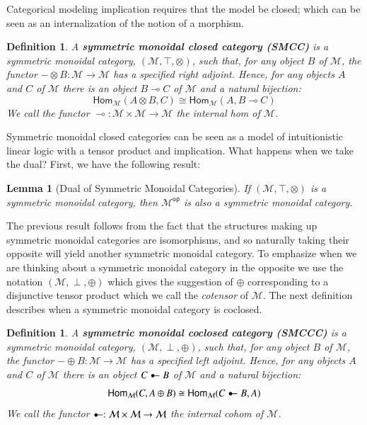 \documentclass{lmcs}
\newtheorem{lemma}[theorem]{Lemma}
\newtheorem{definition}[theorem]{Definition}
\let\mto\to
\let\to\relax
\newcommand{\to}{\rightarrow}
\newcommand{\cat}[1]{\mathcal{#1}}
\newcommand{\catop}[1]{\cat{#1}^{\mathsf{op}}}
\newcommand{\Hom}[3]{\mathsf{Hom}_{\cat{#1}}(#2,#3)}
\newcommand{\limp}[0]{\multimap}
\newcommand{\colimp}[0]{\multimapdotinv}
\begin{document}
Categorical modeling implication requires that the model be closed;
which can be seen as an internalization of the notion of a morphism.
\begin{definition}
  \label{def:SMCC}
  A \textbf{symmetric monoidal closed category (SMCC)} is a symmetric
  monoidal category, $(\cat{M},\top,\otimes)$, such that, for any object
  $B$ of $\cat{M}$, the functor $- \otimes B : \cat{M} \mto \cat{M}$
  has a specified right adjoint.  Hence, for any objects $A$ and $C$
  of $\cat{M}$ there is an object $B \limp C$ of $\cat{M}$ and a
  natural bijection:
  \[
  \Hom{\cat{M}}{A \otimes B}{C} \cong \Hom{\cat{M}}{A}{B \limp C}
  \]
  We call the functor $\limp : \cat{M} \times \cat{M} \mto \cat{M}$
  the internal hom of $\cat{M}$.
\end{definition}

Symmetric monoidal closed categories can be seen as a model of
intuitionistic linear logic with a tensor product and implication.
What happens when we take the dual?  First, we have the following
result:
\begin{lemma}[Dual of Symmetric Monoidal Categories]
  \label{lemma:dual_of_symmetric_monoidal_categories}
  If $(\cat{M},\top,\otimes)$ is a symmetric monoidal category, then
  $\catop{M}$ is also a symmetric monoidal category.
\end{lemma}
The previous result follows from the fact that the structures making
up symmetric monoidal categories are isomorphisms, and so naturally
taking their opposite will yield another symmetric monoidal category.
To emphasize when we are thinking about a symmetric monoidal category
in the opposite we use the notation $(\cat{M},\perp,\oplus)$ which gives
the suggestion of $\oplus$ corresponding to a disjunctive tensor
product which we call the \textit{cotensor} of $\cat{M}$. The next
definition describes when a symmetric monoidal category is coclosed.
\begin{definition}
  \label{def:SMCC}
  A \textbf{symmetric monoidal coclosed category (SMCCC)} is a symmetric
  monoidal category, $(\cat{M},\perp,\oplus)$, such that, for any object
  $B$ of $\cat{M}$, the functor $- \oplus B : \cat{M} \mto \cat{M}$
  has a specified left adjoint.  Hence, for any objects $A$ and $C$
  of $\cat{M}$ there is an object $C \colimp B$ of $\cat{M}$ and a
  natural bijection:
  \[
  \Hom{\cat{M}}{C}{A \oplus B} \cong \Hom{\cat{M}}{C \colimp B}{A}
  \]
  We call the functor $\colimp : \cat{M} \times \cat{M} \mto \cat{M}$
  the internal cohom of $\cat{M}$.
\end{definition}
\end{document}
